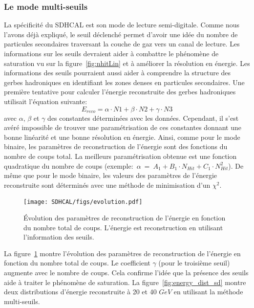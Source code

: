 \subsubsection{Le mode multi-seuils}
La spécificité du SDHCAL est son mode de lecture semi-digitale. Comme nous l'avons déjà expliqué, le seuil déclenché permet d'avoir une idée du nombre de particules secondaires traversant la couche de gaz vers un canal de lecture. Les informations sur les seuils devraient aider à combattre le phénomène de saturation vu sur la figure~\ref{fig:nhitLin} et à améliorer la résolution en énergie. Les informations des seuils pourraient aussi aider à comprendre la structure des gerbes hadroniques en identifiant les zones denses en particules secondaires. Une première tentative pour calculer l'énergie reconstruite des gerbes hadroniques utilisait l'équation suivante:
\begin{equation}
  E_{reco}=\alpha\cdot N1+\beta\cdot N2+\gamma\cdot N3
  \label{eq.erec}
\end{equation}
avec $\alpha$, $\beta$ et $\gamma$ des constantes déterminées avec les données. Cependant, il s'est avéré impossible de trouver une paramétrisation de ces constantes donnant une bonne linéarité et une bonne résolution en énergie. Ainsi, comme pour le mode binaire, les paramètres de reconstruction de l'énergie sont des fonctions du nombre de coups total. La meilleurs paramétrisation obtenue est une fonction quadratique du nombre de coups (exemple:~$\alpha~=~A_1+B_1\cdot N_{Hit}+C_1\cdot N_{Hit}^2$). De même que pour le mode binaire, les valeurs des paramètres de l'énergie reconstruite sont déterminés avec une méthode de minimisation d'un $\chi^2$. 
\begin{figure}[!h]
  \begin{center}
    \texttt{[image: SDHCAL/figs/evolution.pdf]}
    \caption{Évolution des paramètres de reconstruction de l'énergie en fonction du nombre total de coups. L'énergie est reconstruction en utilisant l'information des seuils.}
    \label{fig:evol}
  \end{center}
\end{figure}
La figure~\ref{fig:evol} montre l'évolution des paramètres de reconstruction de l'énergie en fonction du nombre total de coups. Le coefficient $\gamma$ (pour le troisième seuil) augmente avec le nombre de coups. Cela confirme l'idée que la présence des seuils aide à traiter le phénomène de saturation. La figure~\ref{fig:energy_dist_sd} montre deux distributions d'énergie reconstruite à 20 et 40 $GeV$ en utilisant la méthode multi-seuils. 
